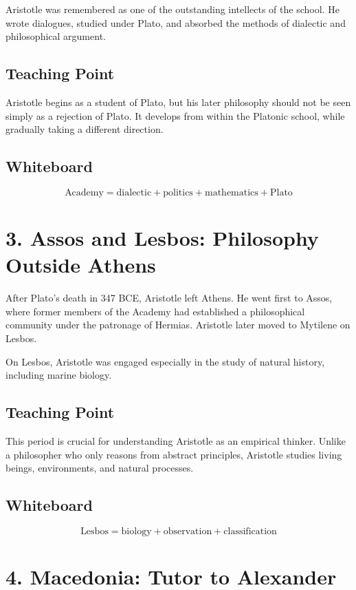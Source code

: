 \documentclass[12pt]{article}
\begin{document}
Aristotle was remembered as one of the outstanding intellects of the school.
He wrote dialogues, studied under Plato, and absorbed the methods of dialectic
and philosophical argument.

\subsection*{Teaching Point}

Aristotle begins as a student of Plato, but his later philosophy should not be
seen simply as a rejection of Plato. It develops from within the Platonic
school, while gradually taking a different direction.

\subsection*{Whiteboard}

\[
\text{Academy} = \text{dialectic} + \text{politics} + \text{mathematics} + \text{Plato}
\]

\section*{3. Assos and Lesbos: Philosophy Outside Athens}

After Plato's death in 347 BCE, Aristotle left Athens. He went first to Assos,
where former members of the Academy had established a philosophical community
under the patronage of Hermias. Aristotle later moved to Mytilene on Lesbos.

On Lesbos, Aristotle was engaged especially in the study of natural history,
including marine biology.

\subsection*{Teaching Point}

This period is crucial for understanding Aristotle as an empirical thinker.
Unlike a philosopher who only reasons from abstract principles, Aristotle
studies living beings, environments, and natural processes.

\subsection*{Whiteboard}

\[
\text{Lesbos} = \text{biology} + \text{observation} + \text{classification}
\]

\section*{4. Macedonia: Tutor to Alexander}
\end{document}
